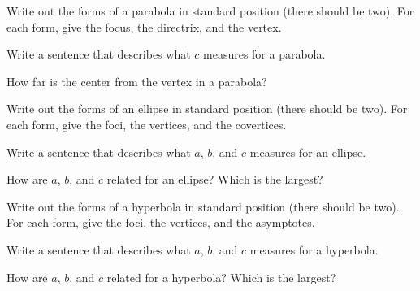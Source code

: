 \bq \label{q32} \be
\item Write out the forms of a parabola in standard position (there should be two). For each form, give the focus, the directrix, and the vertex.
\item Write a sentence that describes what $c$ measures for a parabola.
\item How far is the center from the vertex in a parabola?
\item Write out the forms of an ellipse in standard position (there should be two). For each form, give the foci, the vertices, and the covertices.
\item Write a sentence that describes what $a$, $b$, and $c$ measures for an ellipse.
\item How are $a$, $b$, and $c$ related for an ellipse? Which is the largest?
\item Write out the forms of a hyperbola in standard position (there should be two). For each form, give the foci, the vertices, and the asymptotes.
\item Write a sentence that describes what $a$, $b$, and $c$ measures for a hyperbola.
\item How are $a$, $b$, and $c$ related for a hyperbola? Which is the largest?
\ee \eq

